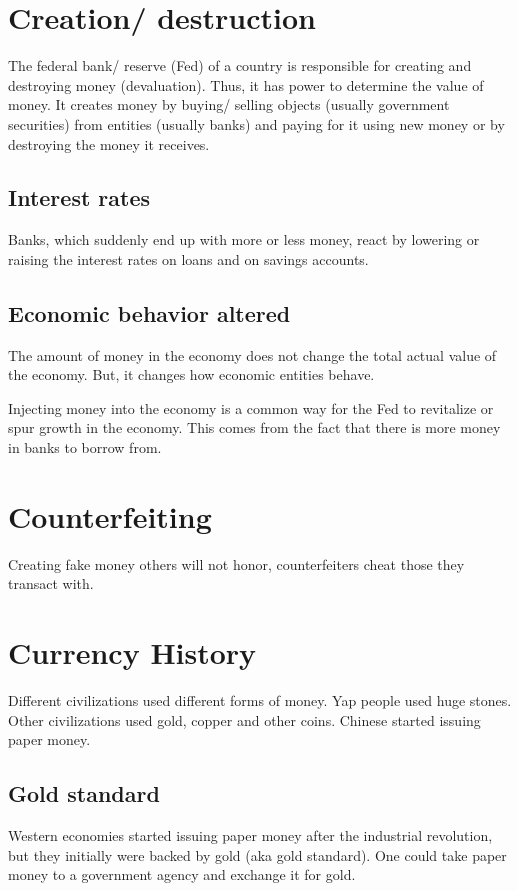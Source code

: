 \documentclass[oneside, article]{memoir}
\begin{document}
\section{Creation/ destruction}
The federal bank/ reserve (Fed) of a country is responsible for creating and destroying money (devaluation). Thus, it has power to determine the value of money. It creates money by buying/ selling objects (usually government securities) from entities (usually banks) and paying for it using new money or by destroying the money it receives.

\subsection{Interest rates}
Banks, which suddenly end up with more or less money, react by lowering or raising the interest rates on loans and on savings accounts.

\subsection{Economic behavior altered}
The amount of money in the economy does not change the total actual value of the economy. But, it changes how economic entities behave.

Injecting money into the economy is a common way for the Fed to revitalize or spur growth in the economy. This comes from the fact that there is more money in banks to borrow from. 

\section{Counterfeiting}
Creating fake money others will not honor, counterfeiters cheat those they transact with.

\section{Currency History}
Different civilizations used different forms of money. Yap people used huge stones. Other civilizations used gold, copper and other coins. Chinese started issuing paper money.

\subsection{Gold standard}
Western economies started issuing paper money after the industrial revolution, but they initially were backed by gold (aka gold standard). One could take paper money to a government agency and exchange it for gold.
\end{document}
